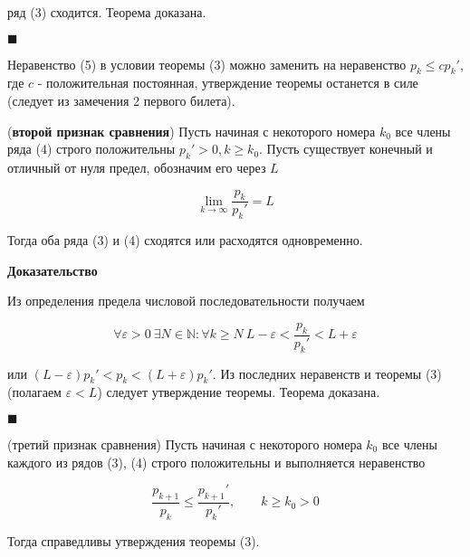 ряд (3) сходится. Теорема доказана.

\begin{flushright}
	$\blacksquare$
\end{flushright}

\begin{note}
	Неравенство (5) в условии теоремы (3) можно заменить на неравенство $p_k \leqslant cp_k'$, где $c$ - положительная постоянная, утверждение теоремы останется в силе (следует из замечения 2 первого билета).
\end{note}

\begin{theorem}
	(\textbf{второй признак сравнения}) Пусть начиная с некоторого номера $k_0$ все члены ряда (4) строго положительны $p_k' > 0, k \geqslant k_0$. Пусть существует конечный и отличный от нуля предел, обозначим его через $L$
	
	\begin{equation}
		\displaystyle\lim_{k \rightarrow \infty} \frac{p_k}{p_k'} = L
	\end{equation}
	
	Тогда оба ряда (3) и (4) сходятся или расходятся одновременно.
\end{theorem}

\textbf{Доказательство}

Из определения предела числовой последовательности получаем

\begin{equation*}
	\forall\varepsilon > 0\ \exists N\in \mathbb{N}: \forall k \geqslant N\ L - \varepsilon < \frac{p_k}{p_k'} < L + \varepsilon
\end{equation*}

или $(L - \varepsilon)p_k' < p_k < (L + \varepsilon)p_k'$. Из последних неравенств и теоремы (3) (полагаем $\varepsilon < L$) следует утверждение теоремы. Теорема доказана.

\begin{flushright}
	$\blacksquare$
\end{flushright}

\begin{theorem}
	(третий признак сравнения) Пусть начиная с некоторого номера $k_0$ все члены каждого из рядов (3), (4) строго положительны и выполняется неравенство
	
	\begin{equation}
		\frac{p_{k + 1}}{p_k} \leqslant \frac{p_{k+1}'}{p_k'}, \qquad k \geqslant k_0 > 0
	\end{equation}
	
	Тогда справедливы утверждения теоремы (3).
\end{theorem}

